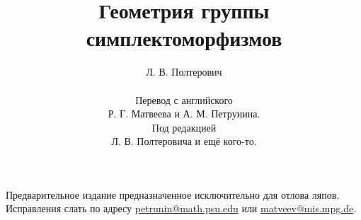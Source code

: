 \documentclass[twoside]{book}
\begin{document}

\title{Геометрия группы симплектоморфизмов}
\author{Л. В. Полтерович\\
\\
Перевод с английского
\\
Р. Г. Матвеева и А. М. Петрунина.
\\
Под редакцией\\
Л. В. Полтеровича и ещё кого-то.
}
\date{}
\maketitle

\thispagestyle{empty}

Предварительное издание предназначенное исключительно для отлова ляпов. 
Исправления слать по адресу 
\url{petrunin@math.psu.edu}
или
\url{matveev@mis.mpg.de}.


\vfill













 


{

\small

\printindex
\printindex[symb]

}

{

\sloppy

\printbibliography[heading=bibintoc]

\fussy

}

\tableofcontents
\end{document}
